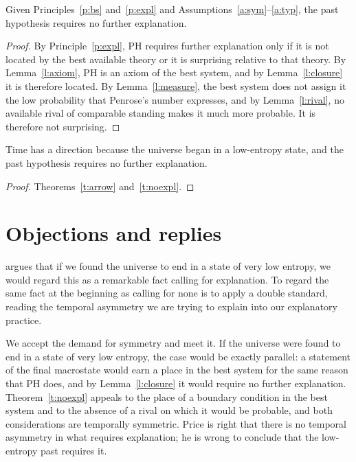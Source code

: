 \documentclass{situationist-preprint}
\begin{document}
\begin{theorem}\label{t:noexpl}
Given Principles~\ref{p:bs} and~\ref{p:expl} and Assumptions~\ref{a:sym}--\ref{a:typ}, the past hypothesis requires no further explanation.
\end{theorem}

\begin{proof}
By Principle~\ref{p:expl}, PH requires further explanation only if it is not located by the best available theory or it is surprising relative to that theory. By Lemma~\ref{l:axiom}, PH is an axiom of the best system, and by Lemma~\ref{l:closure} it is therefore located. By Lemma~\ref{l:measure}, the best system does not assign it the low probability that Penrose's number expresses, and by Lemma~\ref{l:rival}, no available rival of comparable standing makes it much more probable. It is therefore not surprising.
\end{proof}

\begin{corollary}\label{c:main}
Time has a direction because the universe began in a low-entropy state, and the past hypothesis requires no further explanation.
\end{corollary}

\begin{proof}
Theorems~\ref{t:arrow} and~\ref{t:noexpl}.
\end{proof}

\section{Objections and replies}\label{s:objections}

\begin{objection}\label{o:price}
\citet{Price1996,Price2004} argues that if we found the universe to end in a state of very low entropy, we would regard this as a remarkable fact calling for explanation. To regard the same fact at the beginning as calling for none is to apply a double standard, reading the temporal asymmetry we are trying to explain into our explanatory practice.
\end{objection}

\begin{reply}
We accept the demand for symmetry and meet it. If the universe were found to end in a state of very low entropy, the case would be exactly parallel: a statement of the final macrostate would earn a place in the best system for the same reason that PH does, and by Lemma~\ref{l:closure} it would require no further explanation. Theorem~\ref{t:noexpl} appeals to the place of a boundary condition in the best system and to the absence of a rival on which it would be probable, and both considerations are temporally symmetric. Price is right that there is no temporal asymmetry in what requires explanation; he is wrong to conclude that the low-entropy past requires it.
\end{reply}
\end{document}
